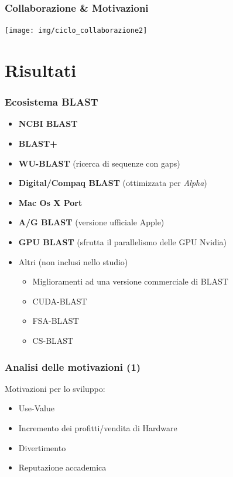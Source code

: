 \begin{frame}\frametitle{Collaborazione \& Motivazioni}

\begin{center}
    \texttt{[image: img/ciclo\_collaborazione2]}
\end{center}

\end{frame}

\section{Risultati}

\begin{frame}\frametitle{Ecosistema BLAST}

\begin{itemize}[<+->]
\itemsep1pt\parskip0pt
\item
  \alert{\textbf{NCBI BLAST}}
\item
  \alert{\textbf{BLAST+}}
\item
  \textbf{WU-BLAST} (ricerca di sequenze con gaps)
\item
  \textbf{Digital/Compaq BLAST} (ottimizzata per \emph{Alpha})
\item
  \textbf{Mac Os X Port}
\item
  \textbf{A/G BLAST} (versione ufficiale Apple)
\item
  \textbf{GPU BLAST} (sfrutta il parallelismo delle GPU Nvidia)
\item
  Altri (non inclusi nello studio)

  \begin{itemize}[<+->]
  \itemsep1pt\parskip0pt
  \item
    Miglioramenti ad una versione commerciale di BLAST
  \item
    CUDA-BLAST
  \item
    FSA-BLAST
  \item
    CS-BLAST
  \end{itemize}
\end{itemize}

\end{frame}

\begin{frame}\frametitle{Analisi delle motivazioni (1)}

Motivazioni per lo \alert{sviluppo}:

\begin{itemize}[<+->]
\itemsep1pt\parskip0pt
\item
  Use-Value
\item
  Incremento dei profitti/vendita di Hardware
\item
  Divertimento
\item
  Reputazione accademica
\end{itemize}

\end{frame}

